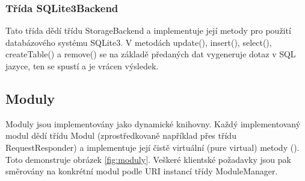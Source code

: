 \subsubsection{Třída SQLite3Backend}

Tato třída dědí třídu StorageBackend a implementuje její metody pro použití databázového systému SQLite3. V metodách
update(), insert(), select(), createTable() a remove() se na základě předaných
dat vygeneruje dotaz v SQL jazyce, ten se spustí
a je vrácen výsledek.

\subsection{Moduly}
\label{implementace_moduly}

Moduly jsou implementovány jako dynamické knihovny. Každý implementovaný modul dědí třídu Modul (zprostředkovaně například přes třídu RequestResponder)
a implementuje její čistě virtuální
(pure virtual) metody (\cite{oop}). Toto demonstruje obrázek \ref{fig:moduly}. %
Veškeré klientské požadavky jsou pak směrovány na konkrétní modul podle URI instancí třídy ModuleManager.


